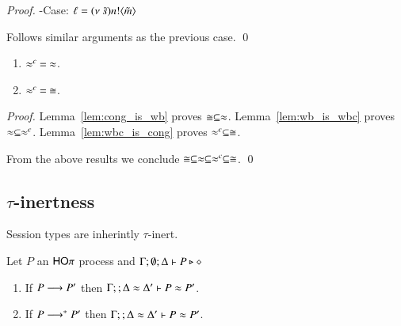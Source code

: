 \begin{proof}
	\noi -Case: $\ell = (\nu\ \tilde{s}) n ! \langle \tilde{m} \rangle$

	\noi Follows similar arguments as the previous case.
	\qed
\end{proof}


\begin{theorem}[Concidence]
	\begin{enumerate}
		\item	$\approx^{c}\ =\ \approx$.
		\item	$\approx^{c}\ =\ \cong$.
	\end{enumerate}
\end{theorem}

\begin{proof}
	\noi	Lemma~\ref{lem:cong_is_wb} proves $\cong \subseteq \approx$.
		Lemma~\ref{lem:wb_is_wbc} proves $\approx \subseteq \approx^{c}$.
		Lemma~\ref{lem:wbc_is_cong} proves $\approx^{c} \subseteq \cong$.

	\noi From the above results we conclude $\cong \subseteq \approx \subseteq \approx^{c} \subseteq \cong$. 
	\qed
\end{proof}


\subsection{$\tau$-inertness}

Session types are inherintly $\tau$-inert.

\begin{lemma}\rm
	\label{lem:tau_inert}
	Let $P$ an $\mathsf{HO}\pi$ process
	and $\Gamma; \emptyset; \Delta \vdash P \triangleright \diamond$
	\begin{enumerate}
		\item	If $P \longrightarrow P'$ then $\Gamma; \empty; \Delta \wb \Delta' \proves P \wb P'$.
		\item	If $P \longrightarrow^* P'$ then $\Gamma; \empty; \Delta \wb \Delta' \proves P \wb P'$.
	\end{enumerate}
\end{lemma}

